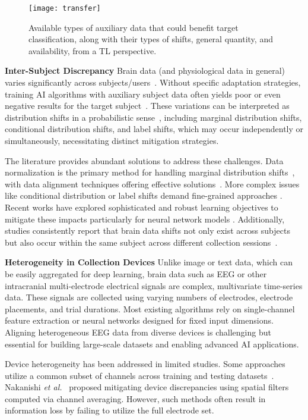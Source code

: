 \documentclass[journal]{IEEEtran}
\begin{document}
\begin{figure*}[htbp]\centering
\texttt{[image: transfer]}
\caption{Available types of auxiliary data that could benefit target classification, along with their types of shifts, general quantity, and availability, from a TL perspective.} \label{fig:transfer}
\end{figure*}

\textbf{Inter-Subject Discrepancy} Brain data (and physiological data in general) varies significantly across subjects/users~\cite{Wu2022a}. Without specific adaptation strategies, training AI algorithms with auxiliary subject data often yields poor or even negative results for the target subject~\cite{Zhang2023}. These variations can be interpreted as distribution shifts in a probabilistic sense~\cite{Pan2010, Zhuang2021}, including marginal distribution shifts, conditional distribution shifts, and label shifts, which may occur independently or simultaneously, necessitating distinct mitigation strategies.

The literature provides abundant solutions to address these challenges. Data normalization is the primary method for handling marginal distribution shifts~\cite{Apicella2023}, with data alignment techniques offering effective solutions~\cite{Zanini2018RA, He2020EA, Wu2022}. More complex issues like conditional distribution or label shifts demand fine-grained approaches \cite{Wong2020, Zhang2020}. Recent works have explored sophisticated and robust learning objectives to mitigate these impacts particularly for neural network models \cite{Li2024T-TIME, Wang2022, Li2020b, Wang2023c}. Additionally, studies consistently report that brain data shifts not only exist across subjects but also occur within the same subject across different collection sessions~\cite{Wu2022, Li2024T-TIME}.

\textbf{Heterogeneity in Collection Devices} Unlike image or text data, which can be easily aggregated for deep learning, brain data such as EEG or other intracranial multi-electrode electrical signals are complex, multivariate time-series data. These signals are collected using varying numbers of electrodes, electrode placements, and trial durations. Most existing algorithms rely on single-channel feature extraction or neural networks designed for fixed input dimensions. Aligning heterogeneous EEG data from diverse devices is challenging but essential for building large-scale datasets and enabling advanced AI applications.

Device heterogeneity has been addressed in limited studies. Some approaches utilize a common subset of channels across training and testing datasets~\cite{Xu2020a, Xie2023}. Nakanishi \emph{et al.}~\cite{Nakanishi2020} proposed mitigating device discrepancies using spatial filters computed via channel averaging. However, such methods often result in information loss by failing to utilize the full electrode set.
\end{document}
